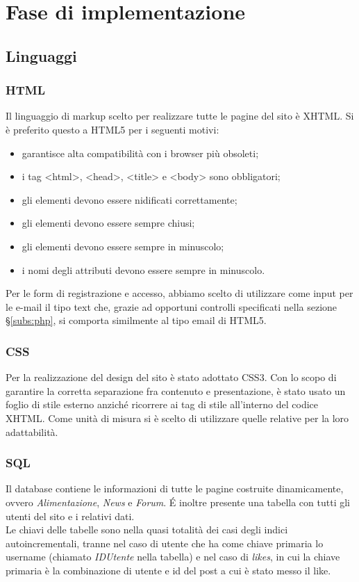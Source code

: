 \section{Fase di implementazione}
\subsection{Linguaggi}
\subsubsection{HTML}
Il linguaggio di markup scelto per realizzare tutte le pagine del sito è XHTML. Si è preferito questo a HTML5 per i seguenti motivi:
\begin{itemize}
    \item garantisce alta compatibilità con i browser più obsoleti;
    \item i tag <html>, <head>, <title> e <body> sono obbligatori;
	\item gli elementi devono essere nidificati correttamente;
	\item gli elementi devono essere sempre chiusi;
	\item gli elementi devono essere sempre in minuscolo;
	\item i nomi degli attributi devono essere sempre in minuscolo.
\end{itemize}

Per le form di registrazione e accesso, abbiamo scelto di utilizzare come input per le e-mail il tipo text che, grazie ad opportuni controlli specificati nella sezione \S\ref{subs:php}, 
si comporta similmente al tipo email di HTML5.

\subsubsection{CSS}
Per la realizzazione del design del sito è stato adottato CSS3. 
Con lo scopo di garantire la corretta separazione fra contenuto e presentazione, è stato usato un foglio di stile esterno anziché ricorrere ai tag di stile all'interno del codice XHTML. 
Come unità di misura si è scelto di utilizzare quelle relative per la loro adattabilità.
\subsubsection{SQL}

Il database contiene le informazioni di tutte le pagine costruite dinamicamente, ovvero \textit{Alimentazione}, \textit{News} e \textit{Forum}. É inoltre presente una tabella con tutti gli utenti del sito e i relativi dati.\\
Le chiavi delle tabelle sono nella quasi totalità dei casi degli indici autoincrementali, tranne nel caso di utente che ha come chiave primaria lo username (chiamato \textit{IDUtente} nella tabella) e nel caso di \textit{likes}, 
in cui la chiave primaria è la combinazione di utente e id del post a cui è stato messo il like.

